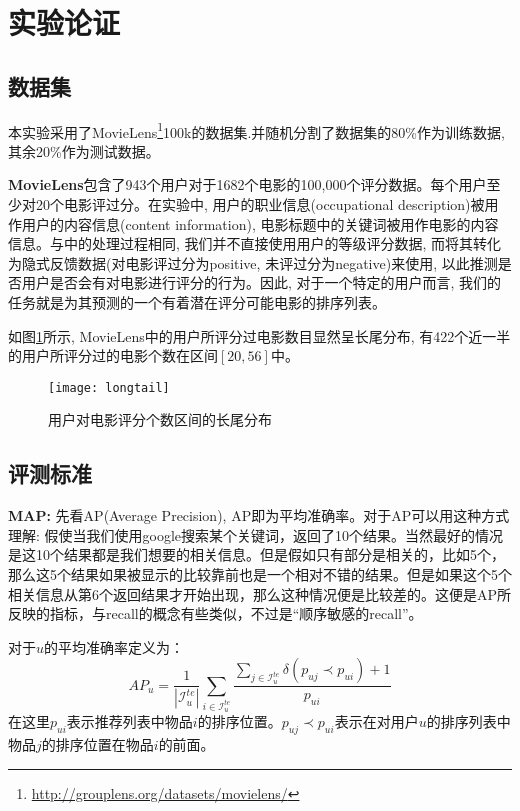\section{实验论证}

\subsection{数据集}
本实验采用了MovieLens\footnote{\url{http://grouplens.org/datasets/movielens/}}100k的数据集.并随机分割了数据集的80\%作为训练数据, 其余20\%作为测试数据。

\textbf{MovieLens}包含了943个用户对于1682个电影的100,000个评分数据。每个用户至少对20个电影评过分。在实验中, 用户的职业信息(occupational description)被用作用户的内容信息(content information), 电影标题中的关键词被用作电影的内容信息。与\cite{gunawardana2009unified}中的处理过程相同, 我们并不直接使用用户的等级评分数据, 而将其转化为隐式反馈数据(对电影评过分为positive, 未评过分为negative)来使用, 以此推测是否用户是否会有对电影进行评分的行为。因此, 对于一个特定的用户而言, 我们的任务就是为其预测的一个有着潜在评分可能电影的排序列表。

如图\ref{gra6}所示, MovieLens中的用户所评分过电影数目显然呈长尾分布, 有422个近一半的用户所评分过的电影个数在区间$[20, 56]$中。
\begin{figure}[htbp]
	
	\begin{center}
		\texttt{[image: longtail]}
		\caption{用户对电影评分个数区间的长尾分布}
		\label{gra6}
	\end{center}
\end{figure}

\subsection{评测标准}

\textbf{MAP:} 先看AP(Average Precision), AP即为平均准确率。对于AP可以用这种方式理解: 假使当我们使用google搜索某个关键词，返回了10个结果。当然最好的情况是这10个结果都是我们想要的相关信息。但是假如只有部分是相关的，比如5个，那么这5个结果如果被显示的比较靠前也是一个相对不错的结果。但是如果这个5个相关信息从第6个返回结果才开始出现，那么这种情况便是比较差的。这便是AP所反映的指标，与recall的概念有些类似，不过是“顺序敏感的recall”。

对于$u$的平均准确率定义为：
\begin{equation*}
AP_u = \frac{1}{|\mathcal{I}_u^{te}|}\sum_{i \in \mathcal{I}_u^{te}}\frac{\sum_{j \in \mathcal{I}_u^{te}}\delta \left(p_{uj} \prec p_{ui}\right) + 1}{p_{ui}}
\end{equation*}
在这里$p_{ui}$表示推荐列表中物品$i$的排序位置。$p_{uj} \prec p_{ui}$表示在对用户$u$的排序列表中物品$j$的排序位置在物品$i$的前面。


